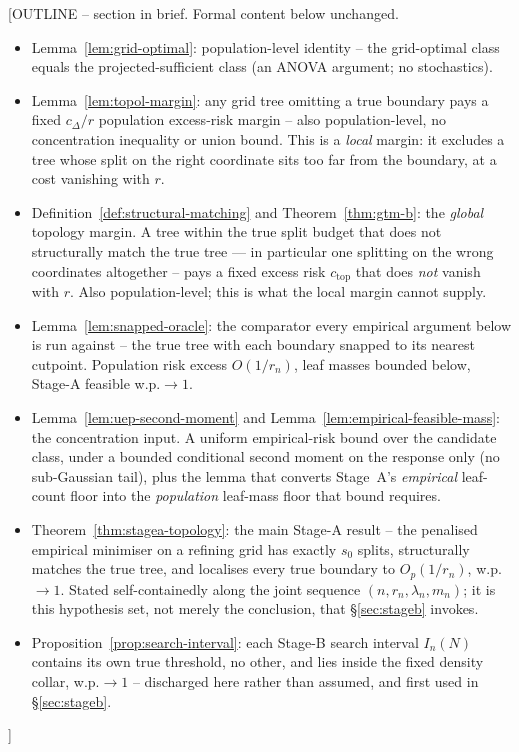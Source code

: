 \documentclass[11pt]{article}
\theoremstyle{plain}
\theoremstyle{definition}
\theoremstyle{remark}
\begin{document}
[OUTLINE -- section in brief. Formal content below unchanged.
\begin{itemize}
\item Lemma~\ref{lem:grid-optimal}: population-level identity -- the
  grid-optimal class equals the projected-sufficient class (an ANOVA
  argument; no stochastics).
\item Lemma~\ref{lem:topol-margin}: any grid tree omitting a true boundary
  pays a fixed $c_\Delta/r$ population excess-risk margin -- also
  population-level, no concentration inequality or union bound. This is a
  \emph{local} margin: it excludes a tree whose split on the right
  coordinate sits too far from the boundary, at a cost vanishing with $r$.
\item Definition~\ref{def:structural-matching} and
  Theorem~\ref{thm:gtm-b}: the \emph{global} topology margin. A tree within
  the true split budget that does not structurally match the true tree ---
  in particular one splitting on the wrong coordinates altogether -- pays a
  fixed excess risk $c_{\mathrm{top}}$ that does \emph{not} vanish with $r$.
  Also population-level; this is what the local margin cannot supply.
\item Lemma~\ref{lem:snapped-oracle}: the comparator every empirical
  argument below is run against -- the true tree with each boundary snapped
  to its nearest cutpoint. Population risk excess $O(1/r_n)$, leaf masses
  bounded below, Stage-A feasible w.p.$\to1$.
\item Lemma~\ref{lem:uep-second-moment} and
  Lemma~\ref{lem:empirical-feasible-mass}: the concentration input. A
  uniform empirical-risk bound over the candidate class, under a bounded
  conditional second moment on the response only (no sub-Gaussian tail),
  plus the lemma that converts Stage~A's \emph{empirical} leaf-count floor
  into the \emph{population} leaf-mass floor that bound requires.
\item Theorem~\ref{thm:stagea-topology}: the main Stage-A result -- the
  penalised empirical minimiser on a refining grid has exactly $s_0$ splits,
  structurally matches the true tree, and localises every true boundary to
  $O_p(1/r_n)$, w.p.$\to1$. Stated self-containedly along the joint sequence
  $(n,r_n,\lambda_n,m_n)$; it is this hypothesis set, not merely the
  conclusion, that \S\ref{sec:stageb} invokes.
\item Proposition~\ref{prop:search-interval}: each Stage-B search interval
  $I_n(N)$ contains its own true threshold, no other, and lies inside the
  fixed density collar, w.p.$\to1$ -- discharged here rather than assumed,
  and first used in \S\ref{sec:stageb}.
\end{itemize}]
\end{document}
